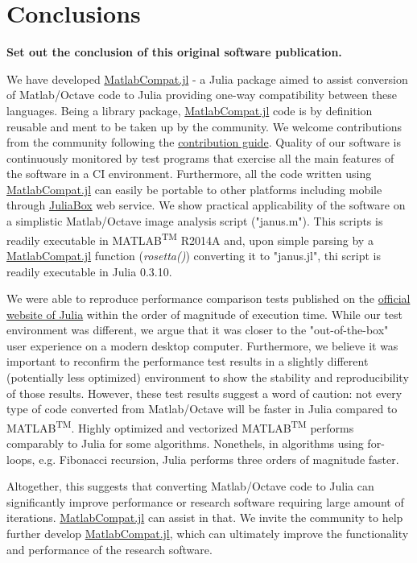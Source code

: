 \section{Conclusions}

\textbf{Set out the conclusion of this original software publication.}

We have developed \href{https://github.com/MatlabCompat/MatlabCompat.jl}{MatlabCompat.jl} - a Julia package aimed to assist conversion of Matlab/Octave code to Julia providing one-way compatibility between these languages. Being a library package, \href{https://github.com/MatlabCompat/MatlabCompat.jl}{MatlabCompat.jl} code is by definition reusable and ment to be taken up by the community. We welcome contributions from the community following the \href{http://matlabcompat.github.io/contribute.html}{contribution guide}. Quality of our software is continuously monitored by test programs that exercise all the main features of the software in a CI environment. Furthermore, all the code written using \href{https://github.com/MatlabCompat/MatlabCompat.jl}{MatlabCompat.jl} can easily be portable to other platforms including mobile through \href{https://www.juliabox.org/}{JuliaBox} web service. We show practical applicability of the software on a simplistic Matlab/Octave image analysis script ("janus.m"). This scripts is readily executable in MATLAB\textsuperscript{TM} R2014A and, upon simple parsing by a \href{https://github.com/MatlabCompat/MatlabCompat.jl}{MatlabCompat.jl} function (\textit{rosetta()}) converting it to "janus.jl", thi script is readily executable in Julia 0.3.10.

We were able to reproduce performance comparison tests published on the \href{http://julialang.org/benchmarks/}{official website of Julia} within the order of magnitude of execution time. While our test environment was different, we argue that it was closer to the "out-of-the-box" user experience on a modern desktop computer. Furthermore, we believe it was important to reconfirm the performance test results in a slightly different (potentially less optimized) environment to show the stability and reproducibility of those results. However, these test results suggest a word of caution: not every type of code converted from Matlab/Octave will be faster in Julia compared to MATLAB\textsuperscript{TM}. Highly optimized and vectorized MATLAB\textsuperscript{TM} performs comparably to Julia for some algorithms. Nonethels, in algorithms using for-loops, e.g. Fibonacci recursion, Julia performs three orders of magnitude faster.

Altogether, this suggests that converting Matlab/Octave code to Julia can significantly improve performance or research software requiring large amount of iterations. \href{https://github.com/MatlabCompat/MatlabCompat.jl}{MatlabCompat.jl} can assist in that. We invite the community to help further develop \href{https://github.com/MatlabCompat/MatlabCompat.jl}{MatlabCompat.jl}, which can ultimately improve the functionality and performance of the research software.
  
  
  
  